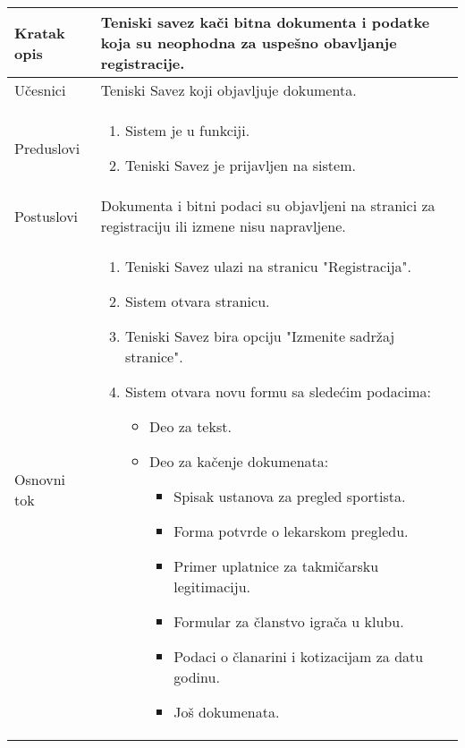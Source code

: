 \documentclass{article}
\begin{document}
 \begin{longtable}{| p{} | p{} |} 
            \hline
                Kratak opis & Teniski savez kači bitna dokumenta i podatke koja su neophodna za uspešno obavljanje registracije. \\ 
            \hline    
                Učesnici & Teniski Savez koji objavljuje dokumenta.\\
            \hline
               Preduslovi & \begin{enumerate}
                   \item Sistem je u funkciji.
                   \item Teniski Savez je prijavljen na sistem. 
                \end{enumerate}\\
            \hline  
                Postuslovi & Dokumenta i bitni podaci su objavljeni na stranici za registraciju ili izmene nisu napravljene.\\
            \hline
                Osnovni tok & \begin{enumerate}
                    \item Teniski Savez ulazi na stranicu "Registracija".
                    \item Sistem otvara stranicu.
                    \item Teniski Savez bira opciju "Izmenite sadržaj stranice".
                    \item Sistem otvara novu formu sa sledećim podacima:
                    \begin{itemize}
                        \item Deo za tekst.
                        \item Deo za kačenje dokumenata:
                        \begin{itemize}
                            \item Spisak ustanova za pregled sportista.
                            \item Forma potvrde o lekarskom pregledu. 
                            \item Primer uplatnice za takmičarsku legitimaciju.
                            \item Formular za članstvo igrača u klubu. 
                            \item Podaci o članarini i kotizacijam za datu godinu.
                            \item Još dokumenata.
                        \end{itemize}

\end{itemize}
\end{enumerate}
\end{longtable}
\end{document}
